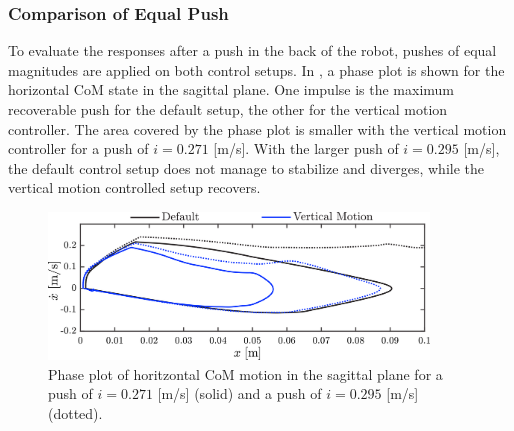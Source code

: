 \subsubsection{Comparison of Equal Push}
To evaluate the responses after a push in the back of the robot, pushes of equal magnitudes are applied on both control setups. In , a phase plot is shown for the horizontal \ac{CoM} state in the sagittal plane. One impulse is the maximum recoverable push for the default setup, the other for the vertical motion controller. The area covered by the phase plot is smaller with the vertical motion controller for a push of $i=0.271$ [m/s]. With the larger push of $i=0.295$ [m/s], the default control setup does not manage to stabilize and diverges, while the vertical motion controlled setup recovers.
\begin{figure}
\centering
\includegraphics[width=0.9\textwidth]{STYLESTUFF/valcomparephase.png}
\caption{Phase plot of horitzontal \ac{CoM} motion in the sagittal plane for a push of $i=0.271$ [m/s] (solid) and a push of $i=0.295$ [m/s] (dotted).}
\label{fig:valcomparephase}
\end{figure}

